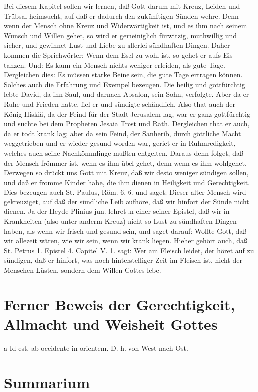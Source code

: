 Bei diesem Kapitel sollen wir lernen, daß Gott darum mit Kreuz, Leiden und Trübsal heimsucht, auf daß er dadurch den zukünftigen Sünden wehre. Denn wenn der Mensch ohne Kreuz und Widerwärtigkeit ist, und es ihm nach seinem Wunsch und Willen gehet, so wird er gemeiniglich fürwitzig, muthwillig und sicher, und gewinnet Lust und Liebe zu allerlei sündhaften Dingen. Daher kommen die Sprichwörter: Wenn dem Esel zu wohl ist, so gehet er aufs Eis tanzen. Und: Es kann ein Mensch nichts weniger erleiden, als gute Tage. Dergleichen dies: Es müssen starke Beine sein, die gute Tage ertragen können. Solches auch die Erfahrung und Exempel bezeugen. Die heilig und gottfürchtig lebte David, da ihn Saul, und darnach Absalon, sein Sohn, verfolgte. Aber da er Ruhe und Frieden hatte, fiel er und sündigte schändlich. Also that auch der König Hiskiä, da der Feind für der Stadt Jerusalem lag, war er ganz gottfürchtig und suchte bei dem Propheten Jesaia Trost und Rath. Dergleichen that er auch, da er todt krank lag; aber da sein Feind, der Sanherib, durch göttliche Macht weggetrieben und er wieder gesund worden war, geriet er in Ruhmredigkeit, welches auch seine Nachkömmlinge mußten entgelten. Daraus denn folget, daß der Mensch frömmer ist, wenn es ihm übel gehet, denn wenn es ihm wohlgehet. Derwegen so drückt uns Gott mit Kreuz, daß wir desto weniger sündigen sollen, und daß er fromme Kinder habe, die ihm dienen in Heiligkeit und Gerechtigkeit. Dies bezeugen auch St. Paulus, Röm. 6, 6. und saget: Dieser alter Mensch wird gekreuziget, auf daß der sündliche Leib aufhöre, daß wir hinfort der Sünde nicht dienen. Ja der Heyde Plinius jun. lehret in einer seiner Epistel, daß wir in Krankheiten (also unter anderm Kreuz) nicht so Lust zu sündhaften Dingen haben, als wenn wir frisch und gesund sein, und saget darauf: Wollte Gott, daß wir allezeit wären, wie wir sein, wenn wir krank liegen. Hieher gehört auch, daß St. Petrus 1. Epistel 4. Capitel V. 1. sagt: Wer am Fleisch leidet, der höret auf zu sündigen, daß er hinfort, was noch hinterstelliger Zeit im Fleisch ist, nicht der Menschen Lüsten, sondern dem Willen Gottes lebe.

\section{Ferner Beweis der Gerechtigkeit, Allmacht und Weisheit Gottes}

a Id est, ab occidente in orientem. D. h. von West nach Ost.

\section{Summarium}

